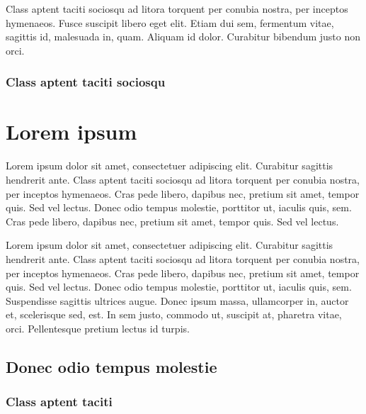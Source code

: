 \begin{lemma}
  Class aptent taciti sociosqu ad litora torquent per conubia nostra, per inceptos hymenaeos. Fusce suscipit libero eget elit. Etiam dui sem, fermentum vitae, sagittis id, malesuada in, quam. Aliquam id dolor. Curabitur bibendum justo non orci.
\end{lemma}

\subsection{Class aptent taciti sociosqu}

\chapter{Lorem ipsum}

\begin{chapterabstract}
  Lorem ipsum dolor sit amet, consectetuer adipiscing elit. Curabitur sagittis hendrerit ante. Class aptent taciti sociosqu ad litora torquent per conubia nostra, per inceptos hymenaeos. Cras pede libero, dapibus nec, pretium sit amet, tempor quis. Sed vel lectus. Donec odio tempus molestie, porttitor ut, iaculis quis, sem. Cras pede libero, dapibus nec, pretium sit amet, tempor quis. Sed vel lectus.
\end{chapterabstract}

Lorem ipsum dolor sit amet, consectetuer adipiscing elit. Curabitur sagittis hendrerit ante. Class aptent taciti sociosqu ad litora torquent per conubia nostra, per inceptos hymenaeos. Cras pede libero, dapibus nec, pretium sit amet, tempor quis. Sed vel lectus. Donec odio tempus molestie, porttitor ut, iaculis quis, sem. Suspendisse sagittis ultrices augue. Donec ipsum massa, ullamcorper in, auctor et, scelerisque sed, est. In sem justo, commodo ut, suscipit at, pharetra vitae, orci. Pellentesque pretium lectus id turpis. \cite{Kopka2004}

\section{Donec odio tempus molestie}

\lipsum[2] \cite{def:1, def:2}

\subsection{Class aptent taciti}

